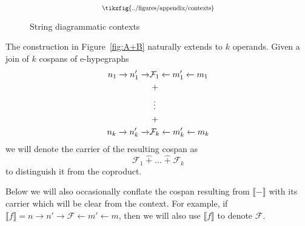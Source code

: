 \begin{figure}
    \[
    \scalebox{0.75}{
        \tikzfig{../figures/appendix/contexts}
    }
    \]
    \caption{String diagrammatic contexts}
    \label{fig:string_contexts}
\end{figure}

\begin{remark}
    The construction in Figure~\ref{fig:A+B} naturally extends to $k$ operands.
    Given a join of $k$ cospans of e-hypegraphs
    \begin{align*}
        n_1 \xrightarrow{} n_1' \xrightarrow{} &\mathcal{F}_1 \xleftarrow{} m_1' \xleftarrow{} m_1\\
        &\;+\\
        &\vdotswithin{+}\\
        &\;+\\
        n_k \xrightarrow{} n_k' \xrightarrow{} &\mathcal{F}_k \xleftarrow{} m_k' \xleftarrow{} m_k
    \end{align*}
    we will denote the carrier of the resulting cospan as
    \[
    \mathcal{F}_1 \; \hat{+}\; \ldots\; \hat{+}\; \mathcal{F}_{k}
    \]
    to distinguish it from the coproduct.
\end{remark}

\begin{remark}
    Below we will also occasionally conflate the cospan resulting from $\llbracket - \rrbracket$ with its carrier which will be clear from the context.
    For example, if $\llbracket f \rrbracket = n \to n' \to \mathcal{F} \xleftarrow{} m' \xleftarrow{} m$, then we will also use $\llbracket f \rrbracket$ to denote $\mathcal{F}$.
\end{remark}

